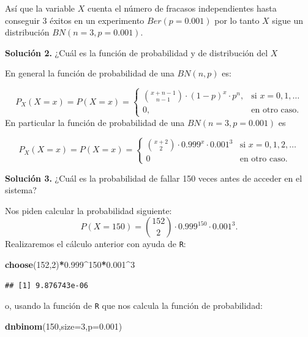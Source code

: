 \documentclass[]{book}
\newenvironment{Shaded}{\begin{snugshade}}{\end{snugshade}}
\newcommand{\DataTypeTok}[1]{\textcolor[rgb]{0.13,0.29,0.53}{#1}}
\newcommand{\DecValTok}[1]{\textcolor[rgb]{0.00,0.00,0.81}{#1}}
\newcommand{\FloatTok}[1]{\textcolor[rgb]{0.00,0.00,0.81}{#1}}
\newcommand{\KeywordTok}[1]{\textcolor[rgb]{0.13,0.29,0.53}{\textbf{#1}}}
\newcommand{\NormalTok}[1]{#1}
\newcommand{\OperatorTok}[1]{\textcolor[rgb]{0.81,0.36,0.00}{\textbf{#1}}}
\begin{document}
Así que la variable \(X\) cuenta el número de fracasos independientes hasta conseguir 3 éxitos en un experimento \(Ber(p=0.001)\) por lo tanto \(X\) sigue un distribución \(BN(n=3,p=0.001).\)

\textbf{Solución 2.} ¿Cuál es la función de probabilidad y de distribución del \(X\)

En general la función de probabilidad de una \(BN(n,p)\) es:

\[
P_X(X=x)=P(X=x)=
\left\{
\begin{array}{cc} 
{x+n-1\choose n-1} \cdot (1-p)^{x}\cdot p^n, & \mbox{si }  x=0,1,\ldots \\ 0, & \mbox{en otro caso.}\end{array}\right.
\]
En particular la función de probabilidad de una \(BN(n=3,p=0.001)\) es

\[
P_X(X=x)=P(X=x)=
\left\{
\begin{array}{cc} 
{x+2\choose 2} \cdot 0.999^{x}\cdot 0.001^3 & \mbox{si }  x=0,1,2,\ldots \\ 0 & \mbox{en otro caso.}\end{array}\right.
\]

\textbf{Solución 3.} ¿Cuál es la probabilidad de fallar 150 veces antes de acceder en el sistema?

Nos piden calcular la probabilidad siguiente:
\[
P(X=150)= {152\choose 2} \cdot 0.999^{150}\cdot 0.001^3.
\]
Realizaremos el cálculo anterior con ayuda de \texttt{R}:

\begin{Shaded}
\begin{Highlighting}[]
\KeywordTok{choose}\NormalTok{(}\DecValTok{152}\NormalTok{,}\DecValTok{2}\NormalTok{)}\OperatorTok{*}\FloatTok{0.999}\OperatorTok{^}\DecValTok{150}\OperatorTok{*}\FloatTok{0.001}\OperatorTok{^}\DecValTok{3}
\end{Highlighting}
\end{Shaded}

\begin{verbatim}
## [1] 9.876743e-06
\end{verbatim}

o, usando la función de \texttt{R} que nos calcula la función de probabilidad:

\begin{Shaded}
\begin{Highlighting}[]
\KeywordTok{dnbinom}\NormalTok{(}\DecValTok{150}\NormalTok{,}\DataTypeTok{size=}\DecValTok{3}\NormalTok{,}\DataTypeTok{p=}\FloatTok{0.001}\NormalTok{)}
\end{Highlighting}
\end{Shaded}
\end{document}
